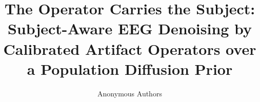 \documentclass[acmsmall,screen,review,anonymous]{acmart}
\title[The Operator Carries the Subject]{The Operator Carries the Subject: Subject-Aware EEG Denoising by Calibrated Artifact Operators over a Population Diffusion Prior}
\author{Anonymous Authors}
\affiliation{%
  \institution{Anonymous Institution}
  \city{Anonymous}
  \country{Anonymous}}
\begin{document}
\maketitle








\balance


\end{document}
